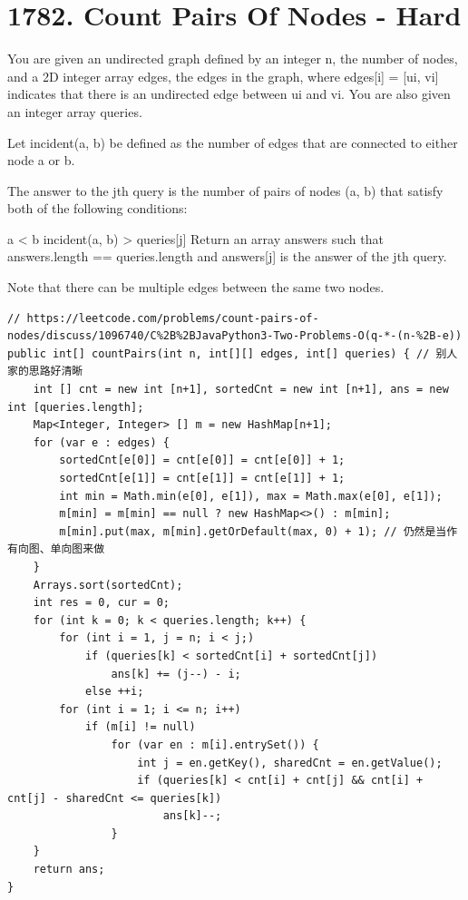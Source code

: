 \documentclass[9pt, b5paaper]{book}
\begin{document}
\section{1782. Count Pairs Of Nodes - Hard}
\label{sec-18-5}
You are given an undirected graph defined by an integer n, the number of nodes, and a 2D integer array edges, the edges in the graph, where edges[i] = [ui, vi] indicates that there is an undirected edge between ui and vi. You are also given an integer array queries.

Let incident(a, b) be defined as the number of edges that are connected to either node a or b.

The answer to the jth query is the number of pairs of nodes (a, b) that satisfy both of the following conditions:

a < b
incident(a, b) > queries[j]
Return an array answers such that answers.length == queries.length and answers[j] is the answer of the jth query.

Note that there can be multiple edges between the same two nodes.
\begin{verbatim}
// https://leetcode.com/problems/count-pairs-of-nodes/discuss/1096740/C%2B%2BJavaPython3-Two-Problems-O(q-*-(n-%2B-e))
public int[] countPairs(int n, int[][] edges, int[] queries) { // 别人家的思路好清晰
    int [] cnt = new int [n+1], sortedCnt = new int [n+1], ans = new int [queries.length];
    Map<Integer, Integer> [] m = new HashMap[n+1];
    for (var e : edges) {
        sortedCnt[e[0]] = cnt[e[0]] = cnt[e[0]] + 1;
        sortedCnt[e[1]] = cnt[e[1]] = cnt[e[1]] + 1;
        int min = Math.min(e[0], e[1]), max = Math.max(e[0], e[1]);
        m[min] = m[min] == null ? new HashMap<>() : m[min];
        m[min].put(max, m[min].getOrDefault(max, 0) + 1); // 仍然是当作有向图、单向图来做
    }
    Arrays.sort(sortedCnt);
    int res = 0, cur = 0;
    for (int k = 0; k < queries.length; k++) {
        for (int i = 1, j = n; i < j;) 
            if (queries[k] < sortedCnt[i] + sortedCnt[j])
                ans[k] += (j--) - i;
            else ++i;
        for (int i = 1; i <= n; i++) 
            if (m[i] != null) 
                for (var en : m[i].entrySet()) {
                    int j = en.getKey(), sharedCnt = en.getValue();
                    if (queries[k] < cnt[i] + cnt[j] && cnt[i] + cnt[j] - sharedCnt <= queries[k])
                        ans[k]--;
                }
    } 
    return ans;
}
\end{verbatim}
\end{document}
